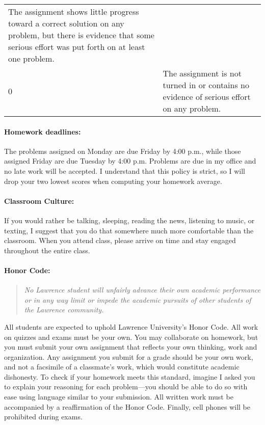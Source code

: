 \documentclass[11pt,]{article}
\begin{document}
\begin{longtable}[]{@{}ll@{}}
\begin{minipage}[t]{0.86\columnwidth}\raggedright\strut
The assignment shows little progress toward a correct solution on any
problem, but there is evidence that some serious effort was put forth on
at least one problem.
\strut\end{minipage}\tabularnewline
\begin{minipage}[t]{0.08\columnwidth}\raggedright\strut
0
\strut\end{minipage} &
\begin{minipage}[t]{0.86\columnwidth}\raggedright\strut
The assignment is not turned in or contains no evidence of serious
effort on any problem.
\strut\end{minipage}\tabularnewline
\bottomrule
\end{longtable}

\paragraph{Homework deadlines:}\label{homework-deadlines}

The problems assigned on Monday are due Friday by 4:00 p.m., while those
assigned Friday are due Tuesday by 4:00 p.m. Problems are due in my
office and no late work will be accepted. I understand that this policy
is strict, so I will drop your two lowest scores when computing your
homework average.

\paragraph{Classroom Culture:}\label{classroom-culture}

If you would rather be talking, sleeping, reading the news, listening to
music, or texting, I suggest that you do that somewhere much more
comfortable than the classroom. When you attend class, please arrive on
time and stay engaged throughout the entire class.

\paragraph{Honor Code:}\label{honor-code}

\begin{quote}
\emph{No Lawrence student will unfairly advance their own academic
performance or in any way limit or impede the academic pursuits of other
students of the Lawrence community.}
\end{quote}

All students are expected to uphold Lawrence University's Honor Code.
All work on quizzes and exams must be your own. You may collaborate on
homework, but you must submit your own assignment that reflects your own
thinking, work and organization. Any assignment you submit for a grade
should be your own work, and not a facsimile of a classmate's work,
which would constitute academic dishonesty. To check if your homework
meets this standard, imagine I asked you to explain your reasoning for
each problem---you should be able to do so with ease using language
similar to your submission. All written work must be accompanied by a
reaffirmation of the Honor Code. Finally, cell phones will be prohibited
during exams.
\end{document}
